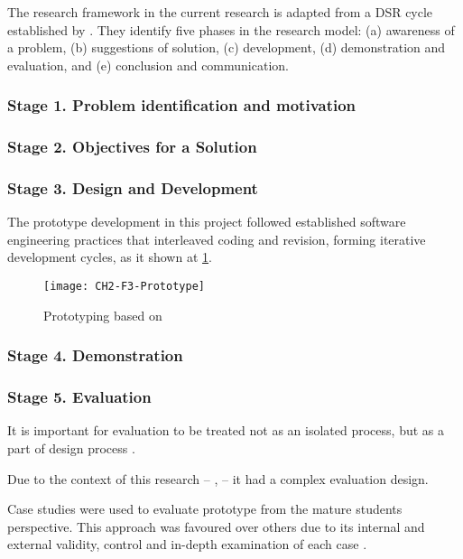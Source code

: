 The research framework in the current research is adapted from a DSR cycle
established by \citet{Vaishnavi2007}. They identify five phases in the research
model: (a) awareness of a problem, (b) suggestions of solution, (c) development,
(d) demonstration and evaluation, and (e) conclusion and communication.

\subsubsection{Stage 1. Problem identification and motivation}

\subsubsection{Stage 2. Objectives for a Solution}

\subsubsection{Stage 3. Design and Development}

The prototype development in this project followed established
software engineering practices that interleaved coding and revision, forming
iterative development cycles, as it shown at \ref{fig:prototype}.

\begin{figure}[htb]
\centering
\texttt{[image: CH2-F3-Prototype]}
\caption[Ptototyping]{Prototyping based on \citet*[p.~411]{Sommerville2007}}
\label{fig:prototype}
\end{figure}

\subsubsection{Stage 4. Demonstration}

\subsubsection{Stage 5. Evaluation}

It is important for evaluation to be treated not as an isolated process, but as
a part of design process \citep{Cleven2009}.

Due to the context of this research -- \LLLsn, -- it had a complex evaluation
design. 

Case studies were used to evaluate prototype from the mature students
perspective. This approach was favoured over others due to its internal and
external validity, control and in-depth examination of each case
\citep{Yin2009}.

